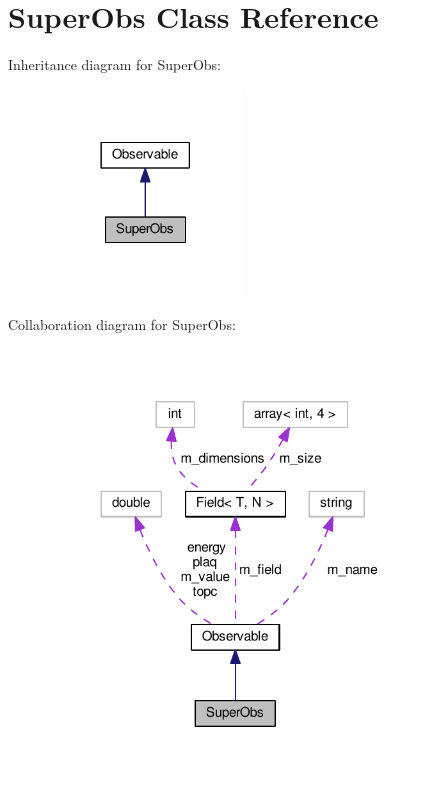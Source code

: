 \hypertarget{classSuperObs}{}\section{Super\+Obs Class Reference}
\label{classSuperObs}


Inheritance diagram for Super\+Obs\+:\nopagebreak
\begin{figure}[H]
\begin{center}
\leavevmode
\includegraphics[width=146pt]{classSuperObs__inherit__graph}
\end{center}
\end{figure}


Collaboration diagram for Super\+Obs\+:\nopagebreak
\begin{figure}[H]
\begin{center}
\leavevmode
\includegraphics[width=288pt]{classSuperObs__coll__graph}
\end{center}
\end{figure}
